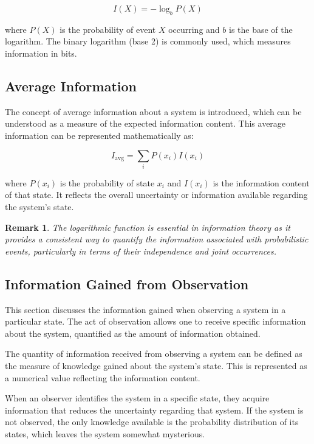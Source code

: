 \documentclass[12pt,a4paper]{article}
\newenvironment{defbox}[1][]{%
  \begin{tcolorbox}[enhanced, breakable, colback=defcolor, colframe=green!50!black, title=#1, fonttitle=\bfseries, arc=3pt, boxrule=0.5pt]
}{\end{tcolorbox}}
\newtheorem{remark}{Remark}[section]
\begin{document}
\begin{equation}
I(X) = -\log_b P(X)
\end{equation}

where \( P(X) \) is the probability of event \( X \) occurring and \( b \) is the base of the logarithm. The binary logarithm (base 2) is commonly used, which measures information in bits.

\subsection{Average Information}
The concept of average information about a system is introduced, which can be understood as a measure of the expected information content. This average information can be represented mathematically as:

\begin{equation}
I_{\text{avg}} = \sum_{i} P(x_i) I(x_i)
\end{equation}

where \( P(x_i) \) is the probability of state \( x_i \) and \( I(x_i) \) is the information content of that state. It reflects the overall uncertainty or information available regarding the system's state.

\begin{remark}
The logarithmic function is essential in information theory as it provides a consistent way to quantify the information associated with probabilistic events, particularly in terms of their independence and joint occurrences.
\end{remark}

\subsection{Information Gained from Observation}
This section discusses the information gained when observing a system in a particular state. The act of observation allows one to receive specific information about the system, quantified as the amount of information obtained.

\begin{defbox}[Quantity of Information]
The quantity of information received from observing a system can be defined as the measure of knowledge gained about the system's state. This is represented as a numerical value reflecting the information content.
\end{defbox}

When an observer identifies the system in a specific state, they acquire information that reduces the uncertainty regarding that system. If the system is not observed, the only knowledge available is the probability distribution of its states, which leaves the system somewhat mysterious.
\end{document}
